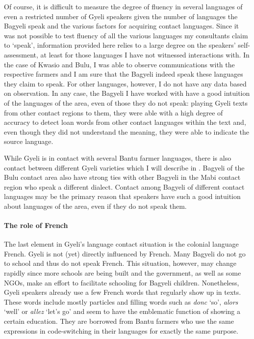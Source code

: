 Of course, it is difficult to measure the degree of fluency in several languages of even a restricted number of Gyeli speakers given the number of languages the Bagyeli speak and the various factors for acquiring contact languages. Since it was not possible to test fluency of all the various languages my consultants claim to `speak', information provided here relies to a large degree on the speakers' self-assessment, at least for those languages I have not witnessed interactions with. In the case of Kwasio and Bulu, I was able to observe communications with the respective farmers and I am sure that the Bagyeli indeed speak these languages they claim to speak. For other languages, however, I do not have any data based on observation. In any case, the Bagyeli I have worked with have a good intuition of the languages of the area, even of those they do not speak: playing Gyeli texts from other contact regions to them, they were able with a high degree of accuracy to detect loan words from other contact languages within the text and, even though they did not understand the meaning, they were able to indicate the source language. 


While Gyeli is in contact with several Bantu farmer languages, there is also contact between  different Gyeli varieties which I will describe in . Bagyeli of the Bulu contact area also have strong ties with other Bagyeli in the Mabi contact region who speak a different dialect. Contact among Bagyeli of different contact languages may be the primary reason that speakers have such a good intuition about languages of the area, even if they do not speak them.


\paragraph{The role of French} The last element in Gyeli's language contact situation is the colonial language French. Gyeli is not (yet) directly influenced by French. Many Bagyeli do not go to school and thus do not speak French. This situation, however, may change rapidly since more schools are being built and the government, as well as some NGOs, make an effort to facilitate schooling for Bagyeli children. Nonetheless, Gyeli speakers already use a few French words that regularly show up in texts. These  words include mostly particles and filling words such as {\itshape donc} `so', {\itshape alors} `well' or {\itshape allez} `let's go' and seem to have the emblematic function of showing a certain education. They are borrowed from Bantu farmers who use the same expressions in code-switching in their languages for exactly the same purpose.

